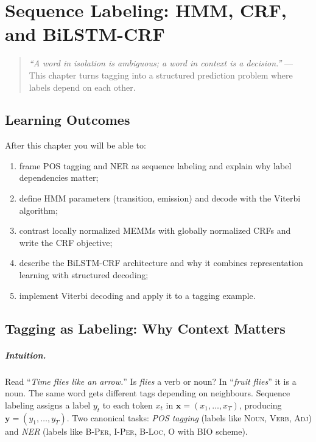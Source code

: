 \chapter{Sequence Labeling: HMM, CRF, and BiLSTM-CRF}
\label{ch:sequence}

\begin{quote}
\emph{``A word in isolation is ambiguous; a word in context is a decision.''} --- This chapter turns tagging into a structured prediction problem where labels depend on each other.
\end{quote}

\noindent{}
\vspace{0.4em}

\section*{Learning Outcomes}
After this chapter you will be able to:
\begin{enumerate}[label=(L\arabic*)]
    \item frame POS tagging and NER as sequence labeling and explain why label dependencies matter;
    \item define HMM parameters (transition, emission) and decode with the Viterbi algorithm;
    \item contrast locally normalized MEMMs with globally normalized CRFs and write the CRF objective;
    \item describe the BiLSTM-CRF architecture and why it combines representation learning with structured decoding;
    \item implement Viterbi decoding and apply it to a tagging example.
\end{enumerate}

\section{Tagging as Labeling: Why Context Matters}
\label{sec:tagging-intuition}
\paragraph{Intuition.} Read ``\emph{Time flies like an arrow.}'' Is \emph{flies} a verb or noun? In ``\emph{fruit flies}'' it is a noun. The same word gets different tags depending on neighbours. Sequence labeling assigns a label $y_t$ to each token $x_t$ in $\mathbf{x}=(x_1,\dots,x_T)$, producing $\mathbf{y}=(y_1,\dots,y_T)$. Two canonical tasks: \emph{POS tagging} (labels like \textsc{Noun}, \textsc{Verb}, \textsc{Adj}) and \emph{NER} (labels like \textsc{B-Per}, \textsc{I-Per}, \textsc{B-Loc}, \textsc{O} with BIO scheme).

